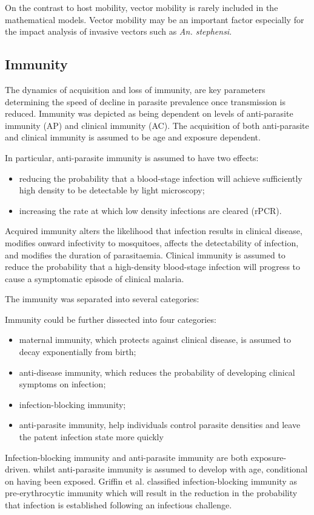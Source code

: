 \documentclass[a4paper, 12pt, twoside]{article}
\begin{document}
On the contrast to host mobility, vector mobility is rarely included in the mathematical models.
Vector mobility may be an important factor especially for the impact analysis of invasive vectors such as \textit{An. stephensi}.

\subsection{Immunity}
The dynamics of acquisition and loss of immunity, are key parameters determining the speed of decline in parasite prevalence once transmission is reduced.
Immunity was depicted as being dependent on levels of anti-parasite immunity (AP) and clinical immunity (AC).
The acquisition of both anti-parasite and clinical immunity is assumed to be age and exposure dependent.

In particular, anti-parasite immunity is assumed to have two effects:
\begin{itemize}
	\item reducing the probability that a blood-stage infection will achieve sufficiently high density to be detectable by light microscopy;
	\item increasing the rate at which low density infections are cleared (rPCR).
\end{itemize}
Acquired immunity alters the likelihood that infection results in clinical disease, modifies onward infectivity to mosquitoes, affects the detectability of infection, and modifies the duration of parasitaemia.
Clinical immunity is assumed to reduce the probability that a high-density blood-stage infection will progress to cause a symptomatic episode of clinical malaria.

The immunity was separated into several categories:

Immunity could be further dissected into four categories:
\begin{itemize}
	\item  maternal immunity, which protects against clinical disease, is assumed to decay exponentially from birth;
	\item  anti-disease immunity, which reduces the probability of developing clinical symptoms on infection;
	\item infection-blocking immunity;
	\item anti-parasite immunity, help individuals control parasite densities and leave the patent infection state more quickly
\end{itemize}
Infection-blocking immunity and anti-parasite immunity are both exposure-driven.
whilst anti-parasite immunity is assumed to develop with age, conditional on having been exposed.
Griffin et al.\cite{Griffin2010} classified infection-blocking immunity as pre-erythrocytic immunity which will result in the reduction in the probability that infection is established following an infectious challenge.
\end{document}
